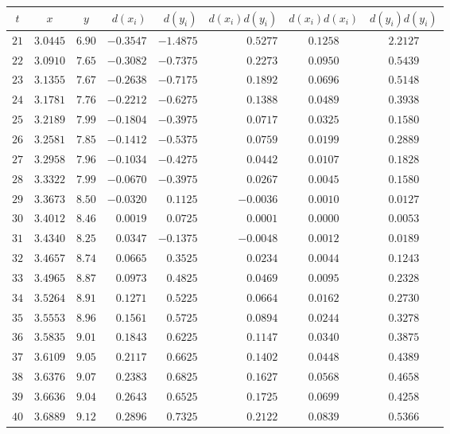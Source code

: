 \begin{tabular}{cccrrrcc} \toprule
$t$  & $x$      & $y$    & $d(x_i)$  & $d(y_i)$  & $d(x_i)d(y_i)$ & $d(x_i)d(x_i)$ & $d(y_i)d(y_i)$ \\\midrule
$21$ & $3.0445$ & $6.90$ & $-0.3547$ & $-1.4875$ & $0.5277$      & $0.1258$       & $2.2127$ \\
$22$ & $3.0910$ & $7.65$ & $-0.3082$ & $-0.7375$ & $0.2273$      & $0.0950$       & $0.5439$ \\
$23$ & $3.1355$ & $7.67$ & $-0.2638$ & $-0.7175$ & $0.1892$      & $0.0696$       & $0.5148$ \\
$24$ & $3.1781$ & $7.76$ & $-0.2212$ & $-0.6275$ & $0.1388$      & $0.0489$       & $0.3938$ \\
$25$ & $3.2189$ & $7.99$ & $-0.1804$ & $-0.3975$ & $0.0717$      & $0.0325$       & $0.1580$ \\
$26$ & $3.2581$ & $7.85$ & $-0.1412$ & $-0.5375$ & $0.0759$      & $0.0199$       & $0.2889$ \\
$27$ & $3.2958$ & $7.96$ & $-0.1034$ & $-0.4275$ & $0.0442$      & $0.0107$       & $0.1828$ \\
$28$ & $3.3322$ & $7.99$ & $-0.0670$ & $-0.3975$ & $0.0267$      & $0.0045$       & $0.1580$ \\
$29$ & $3.3673$ & $8.50$ & $-0.0320$ & $0.1125$  & $-0.0036$     & $0.0010$       & $0.0127$ \\
$30$ & $3.4012$ & $8.46$ & $0.0019$  & $0.0725$  & $0.0001$      & $0.0000$       & $0.0053$ \\
$31$ & $3.4340$ & $8.25$ & $0.0347$  & $-0.1375$ & $-0.0048$     & $0.0012$       & $0.0189$ \\
$32$ & $3.4657$ & $8.74$ & $0.0665$  & $0.3525$  & $0.0234$      & $0.0044$       & $0.1243$ \\
$33$ & $3.4965$ & $8.87$ & $0.0973$  & $0.4825$  & $0.0469$      & $0.0095$       & $0.2328$ \\
$34$ & $3.5264$ & $8.91$ & $0.1271$  & $0.5225$  & $0.0664$      & $0.0162$       & $0.2730$ \\
$35$ & $3.5553$ & $8.96$ & $0.1561$  & $0.5725$  & $0.0894$      & $0.0244$       & $0.3278$ \\
$36$ & $3.5835$ & $9.01$ & $0.1843$  & $0.6225$  & $0.1147$      & $0.0340$       & $0.3875$ \\
$37$ & $3.6109$ & $9.05$ & $0.2117$  & $0.6625$  & $0.1402$      & $0.0448$       & $0.4389$ \\
$38$ & $3.6376$ & $9.07$ & $0.2383$  & $0.6825$  & $0.1627$      & $0.0568$       & $0.4658$ \\
$39$ & $3.6636$ & $9.04$ & $0.2643$  & $0.6525$  & $0.1725$      & $0.0699$       & $0.4258$ \\
$40$ & $3.6889$ & $9.12$ & $0.2896$  & $0.7325$  & $0.2122$      & $0.0839$       & $0.5366$ \\\bottomrule
\end{tabular}
